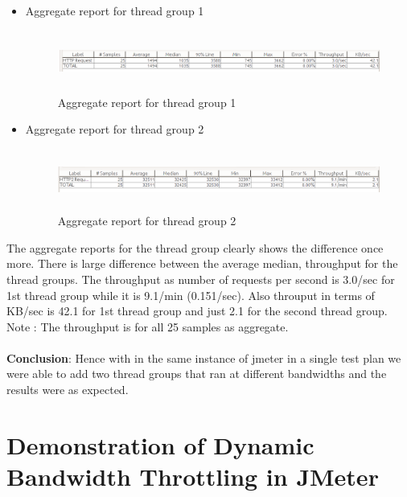 \documentclass[12pt]{book}
\begin{document}
  \begin{itemize}
   \item Aggregate report for thread group 1
	 \begin{figure}[H]
	  \centering
	  \includegraphics[width=15cm, height=2cm]{images/bt_7}
	  \caption{Aggregate report for thread group 1\label{fig:fig56_JMeter}}
	 \end{figure}
   \item Aggregate report for thread group 2
	 \begin{figure}[H]
	  \centering
	  \includegraphics[width=15cm, height=2cm]{images/bt_6}
	  \caption{Aggregate report for thread group 2\label{fig:fig57_JMeter}}
	 \end{figure} 
  \end{itemize}
  
  The aggregate reports for the thread group clearly shows the difference once more. There is large
  difference between the average median, throughput for the thread groups. The throughput as
  number of requests per second is 3.0/sec for 1st thread group while it is 9.1/min (0.151/sec). Also
  throuput in terms of KB/sec is 42.1 for 1st thread group and just 2.1 for the second thread group.
  Note : The throughput is for all 25 samples as aggregate.\\
  \\
  \textbf{Conclusion}:
  Hence with in the same instance of jmeter in a single test plan we were able to add two thread
  groups that ran at different bandwidths and the results were as expected.
  
 \section{Demonstration of Dynamic Bandwidth Throttling in JMeter}
 
\end{document}

